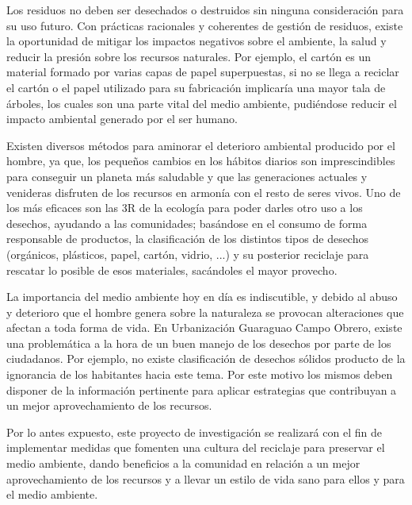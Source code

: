 Los residuos no deben ser desechados o destruidos sin ninguna consideración para su uso futuro. Con prácticas racionales y coherentes de gestión de residuos, existe la oportunidad de mitigar los impactos negativos sobre el ambiente, la salud y reducir la presión sobre los recursos naturales. Por ejemplo, el cartón es un material formado por varias capas de papel superpuestas, si no se llega a reciclar el cartón o el papel utilizado para su fabricación implicaría una mayor tala de árboles, los cuales son una parte vital del medio ambiente, pudiéndose reducir el impacto ambiental generado por el ser humano.

Existen diversos métodos para aminorar el deterioro ambiental producido por el hombre, ya que, los pequeños cambios en los hábitos diarios son imprescindibles para conseguir un planeta más saludable y que las generaciones actuales y venideras disfruten de los recursos en armonía con el resto de seres vivos. Uno de los más eficaces son las 3R de la ecología para poder darles otro uso a los desechos, ayudando a las comunidades; basándose en el consumo de forma responsable de productos, la clasificación de los distintos tipos de desechos (orgánicos, plásticos, papel, cartón, vidrio, ...) y su posterior reciclaje para rescatar lo posible de esos materiales, sacándoles el mayor provecho.

 La importancia del medio ambiente hoy en día es indiscutible, y debido al abuso y deterioro que el hombre genera sobre la naturaleza se provocan alteraciones que afectan a toda forma de vida. En Urbanización Guaraguao Campo Obrero, existe una problemática a la hora de un buen manejo de los desechos por parte de los ciudadanos. Por ejemplo, no existe clasificación de desechos sólidos producto de la ignorancia de los habitantes hacia este tema. Por este motivo los mismos deben disponer de la información pertinente para aplicar estrategias que contribuyan a un mejor aprovechamiento de los recursos.

Por lo antes expuesto, este proyecto de investigación se realizará con el fin de implementar medidas que fomenten una cultura del reciclaje para preservar el medio ambiente, dando beneficios a la comunidad en relación a un mejor aprovechamiento de los recursos y a llevar un estilo de vida sano para ellos y para el medio ambiente. 

\newpage
